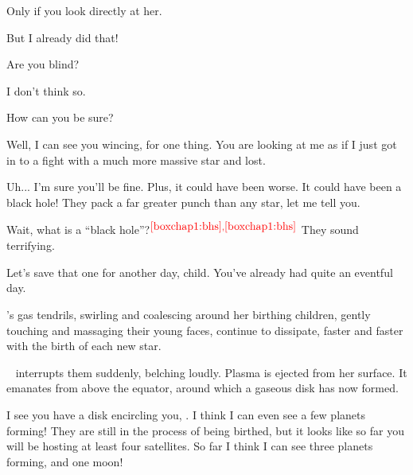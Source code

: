 \documentclass[main.tex]{subfiles}
\begin{document}
\par \Pleione Only if you look directly at her.

\par \Maia But I already did that!

\par \Pleione Are you blind?

\par \Maia I don't think so.

\par \Pleione How can you be sure?

\par \Maia Well, I can see you wincing, for one thing.  You are looking at me as if I just got in to a fight with a much more massive star and lost.

\par \Pleione Uh... I'm sure you'll be fine. Plus, it could have been worse.  It could have been a black hole!  They pack a far greater punch than any star, let me tell you.

\par \Maia Wait, what is a ``black hole''?$^{\textcolor{red}{{\ref{boxchap1:bhs}},\textcolor{red}{\ref{boxchap1:bhs}}}}$  They sound terrifying.



\par \Pleione Let's save that one for another day, child.  You've already had quite an eventful day.

\par \nar \rmpleione's gas tendrils, swirling and coalescing around her birthing children, gently touching and massaging their young faces, continue to dissipate, faster and faster with the birth of each new star.

\par \nar \rmelectra~ interrupts them suddenly, belching loudly.  Plasma is ejected from her surface.  It emanates from above the equator, around which a gaseous disk has now formed.  

\par \Maia I see you have a disk encircling you, \rmelectra.  I think I can even see a few planets forming!  They are still in the process of being birthed, but it looks like so far you will be hosting at least four satellites.  So far I think I can see three planets forming, and one moon!
\end{document}
